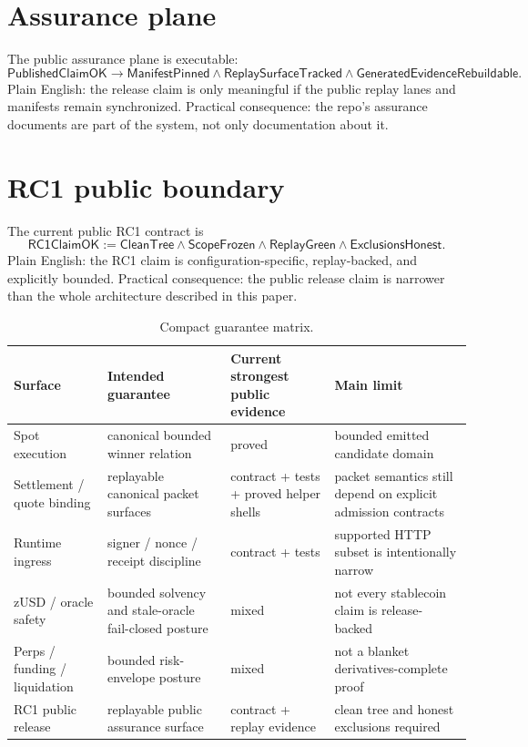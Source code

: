 \documentclass[9pt]{extarticle}
\begin{document}
\section{Assurance plane}
The public assurance plane is executable:
\[
\mathsf{PublishedClaimOK}
\to \mathsf{ManifestPinned} \wedge \mathsf{ReplaySurfaceTracked}
\wedge \mathsf{GeneratedEvidenceRebuildable}.
\]
Plain English: the release claim is only meaningful if the public replay
lanes and manifests remain synchronized.
Practical consequence: the repo's assurance documents are part of the system,
not only documentation about it.

\section{RC1 public boundary}
The current public RC1 contract is
\[
\mathsf{RC1ClaimOK} := \mathsf{CleanTree} \wedge \mathsf{ScopeFrozen} \wedge \mathsf{ReplayGreen} \wedge \mathsf{ExclusionsHonest}.
\]
Plain English: the RC1 claim is configuration-specific, replay-backed, and
explicitly bounded.
Practical consequence: the public release claim is narrower than the whole
architecture described in this paper.

\begin{table}[t]
\centering
\small
\begin{tabular}{@{}L{31mm}L{23mm}L{27mm}L{53mm}@{}}
\toprule
Surface & Intended guarantee & Current strongest public evidence & Main limit \\
\midrule
Spot execution & canonical bounded winner relation & proved & bounded emitted candidate domain \\
Settlement / quote binding & replayable canonical packet surfaces & contract + tests + proved helper shells & packet semantics still depend on explicit admission contracts \\
Runtime ingress & signer / nonce / receipt discipline & contract + tests & supported HTTP subset is intentionally narrow \\
zUSD / oracle safety & bounded solvency and stale-oracle fail-closed posture & mixed & not every stablecoin claim is release-backed \\
Perps / funding / liquidation & bounded risk-envelope posture & mixed & not a blanket derivatives-complete proof \\
RC1 public release & replayable public assurance surface & contract + replay evidence & clean tree and honest exclusions required \\
\bottomrule
\end{tabular}
\caption{Compact guarantee matrix.}
\end{table}
\end{document}
